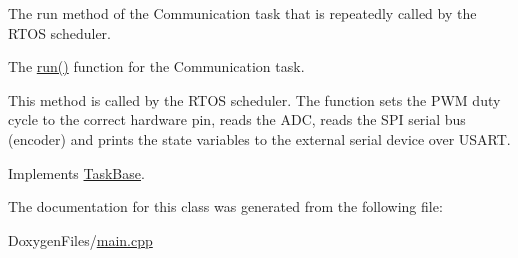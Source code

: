 The run method of the Communication task that is repeatedly called by the R\+T\+OS scheduler. 

The {\ttfamily \mbox{\hyperlink{class_communication_task_a33c23712d6b6952d3e7fb180bab34a83}{run()}}} function for the Communication task.

This method is called by the R\+T\+OS scheduler. The function sets the P\+WM duty cycle to the correct hardware pin, reads the A\+DC, reads the S\+PI serial bus (encoder) and prints the state variables to the external serial device over U\+S\+A\+RT. 

Implements \mbox{\hyperlink{class_task_base_adcf6036ad9c860051ccf392ba5e7dbbc}{Task\+Base}}.



The documentation for this class was generated from the following file\+:\begin{DoxyCompactItemize}
\item 
Doxygen\+Files/\mbox{\hyperlink{main_8cpp}{main.\+cpp}}\end{DoxyCompactItemize}
